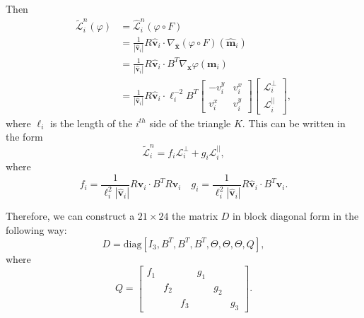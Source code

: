 Then
\begin{align*}
  \tilde{\mathcal{L}}^n_i(\varphi) &= \hat{\mathcal{L}}^n_i(\varphi\circ F) \\
  &= \frac{1}{|\hat{\mathbf{v}}_i|}R \hat{\mathbf{v}}_i \cdot
    \nabla_{\hat{\mathbf{x}}}(\varphi \circ F)(\hat{\mathbf{m}}_i) \\
  &= \frac{1}{|\hat{\mathbf{v}}_i|}R \hat{\mathbf{v}}_i \cdot B^T
    \nabla_{\mathbf{x}} \varphi(\mathbf{m}_i) \\
  &= \frac{1}{|\hat{\mathbf{v}}_i|}R \hat{\mathbf{v}}_i \cdot \ell_i^{-2} B^T
  \begin{bmatrix} -v^y_i & v^x_i \\ v^x_i & v^y_i \end{bmatrix}
  \begin{bmatrix}
    \mathcal{L}^{\perp}_i \\ \mathcal{L}^{||}_i
  \end{bmatrix},
\end{align*}
where $\ell_i$ is the length of the $i^{th}$ side of the triangle $K$. This can be written in the form
\begin{equation*}
  \tilde{\mathcal{L}}_i^n = f_i \mathcal{L}^{\perp}_i + g_i \mathcal{L}^{||}_i,
\end{equation*}
where
\begin{equation*}
  f_i = \frac{1}{\ell_i^2 |\hat{\mathbf{v}}_i|}R \hat{\mathbf{v}}_i \cdot B^T
    R\mathbf{v}_i \quad
  g_i = \frac{1}{\ell_i^2 |\hat{\mathbf{v}}_i|}R \hat{\mathbf{v}}_i \cdot B^T
    \mathbf{v}_i .
\end{equation*}

Therefore, we can construct a $21\times 24$ the matrix $D$ in block diagonal
form in the following way:
\begin{equation*}
  D = \text{diag}[I_3, B^T, B^T, B^T, \Theta, \Theta, \Theta, Q],
\end{equation*}
where
\begin{equation*}
  Q = \left[\begin{array}{ccc|ccc}
    f_1 & & & g_1 & & \\
    & f_2 & & & g_2 &\\
    & & f_3 & & & g_3
  \end{array}\right].
\end{equation*}

